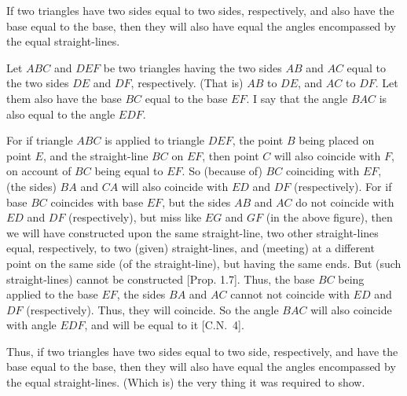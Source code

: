\begin{Parallel}{}{}
{If two triangles have  two sides equal to two sides, respectively, 
and also have the base equal to the base, then they will
also have equal the angles  encompassed by
the equal straight-lines.

\epsfysize=1.75in
\centerline{}

Let $ABC$ and $DEF$ be two triangles having the two sides $AB$ and $AC$ equal to the two
sides $DE$ and $DF$, respectively. (That is) $AB$ to $DE$, and $AC$ to $DF$.  Let them also have
the base $BC$ equal to the base $EF$. I say that the angle $BAC$ is also equal
to the angle $EDF$.

For if triangle $ABC$ is applied to triangle $DEF$, the point $B$ being placed on
point $E$, and the straight-line $BC$ on $EF$, then point $C$ will also coincide with $F$, on
account of $BC$ being equal to $EF$.
So  (because of) $BC$ coinciding with $EF$,  (the sides) $BA$ and $CA$ will also
coincide with  $ED$ and $DF$ (respectively). 
For if base $BC$ coincides with base $EF$, but the sides $AB$ and $AC$ 
do not coincide with $ED$ and $DF$ (respectively), but miss like $EG$
and $GF$ (in the above figure), 
then we will have constructed upon the same straight-line, two other straight-lines equal, respectively, to two (given) straight-lines,  and (meeting)
at a different point on the same
side (of the straight-line), but having the same ends. But (such straight-lines) cannot be constructed [Prop. 1.7].
Thus,  the base $BC$ being applied to the  base $EF$,  the sides $BA$ and $AC$
cannot not coincide with $ED$ and $DF$ (respectively). Thus, they
will coincide. So the angle $BAC$ will also coincide with angle $EDF$,
and will be equal to it [C.N.~4].

Thus, if two triangles have  two  sides equal to two side, respectively,
and  have the base equal to the base, then they will also have equal the angles  encompassed by
the equal straight-lines. (Which is) the very thing it was required to show.}
\end{Parallel}

